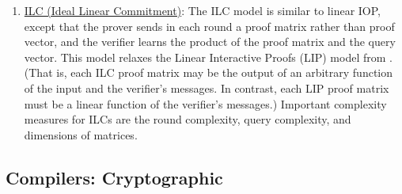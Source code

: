 \begin{enumerate}[label=\alph*.]
	\item{} \underline{ILC (Ideal Linear Commitment)}: 
	The ILC model is similar to linear IOP, except that the prover sends in each round a proof matrix rather than proof vector, and the verifier learns the product of the proof matrix and the query vector. 
	This model relaxes the Linear Interactive Proofs (LIP) model from \cite{2013:tcc:snargs-via-LIPs}. 
	(That is, each ILC proof matrix may be the output of an arbitrary function of the input and the verifier’s messages. In contrast, each LIP proof matrix must be a linear function of the verifier’s messages.) 
	Important complexity measures for ILCs are the round complexity, query complexity, and dimensions of matrices.
	
	\end{enumerate}


\subsection{Compilers: Cryptographic}
\label{paradigms:taxonomy:compilers-crypto} 
	
